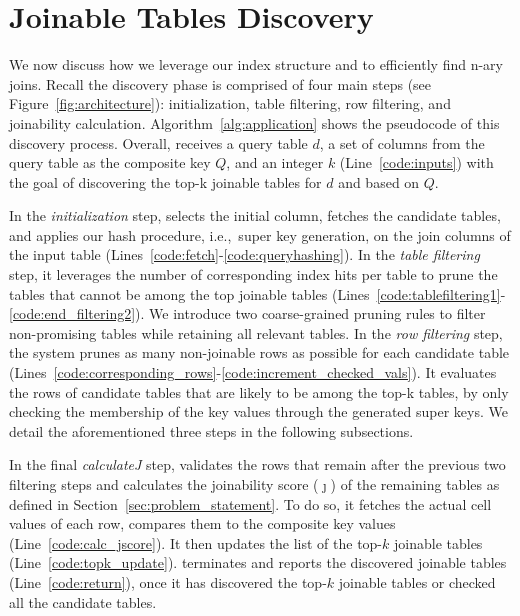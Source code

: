 
\section{Joinable Tables Discovery}\label{sec:index_applicaiton}
We now discuss how we leverage our index structure and \hash to efficiently find n-ary joins.
Recall the discovery phase is comprised of four main steps (see Figure~\ref{fig:architecture}): initialization, table filtering, row filtering, and joinability calculation.
Algorithm~\ref{alg:application} shows the pseudocode of this discovery process.
Overall, \system receives a query table $d$, a set of columns from the query table as the composite key $Q$, and an integer $k$ (Line~\ref{code:inputs}) with the goal of discovering the top-k joinable tables for $d$ and based on $Q$.



In the {\em initialization} step, \system selects the initial column, fetches the candidate tables, and applies our hash procedure, i.e.,~super key generation, on the join columns of the input table (Lines~\ref{code:fetch}-\ref{code:queryhashing}).
In the {\em table filtering} step, it leverages the number of corresponding index hits per table to prune the tables that cannot be among the top joinable tables (Lines~\ref{code:tablefiltering1}-\ref{code:end_filtering2}).
We introduce two coarse-grained pruning rules to filter non-promising tables while retaining all relevant tables.
In the {\em row filtering} step, the system prunes as many non-joinable rows as possible for each candidate table (Lines~\ref{code:corresponding_rows}-\ref{code:increment_checked_vals}).
It evaluates the rows of candidate tables that are likely to be among the top-k tables, by only checking the membership of the key values through the generated super keys.
We detail the aforementioned three steps in the following subsections.

In the final {\em calculateJ} step, \system validates the rows that remain after the previous two filtering steps and calculates the joinability score ($\jmath$) of the remaining tables as defined in Section~\ref{sec:problem_statement}.
To do so, it fetches the actual cell values of each row, compares them to the composite key values (Line~\ref{code:calc_jscore}).
It then updates the list of the top-$k$ joinable tables (Line~\ref{code:topk_update}).
\system terminates and reports the discovered joinable tables (Line~\ref{code:return}), once it has discovered the top-$k$ joinable tables or checked all the candidate tables.

